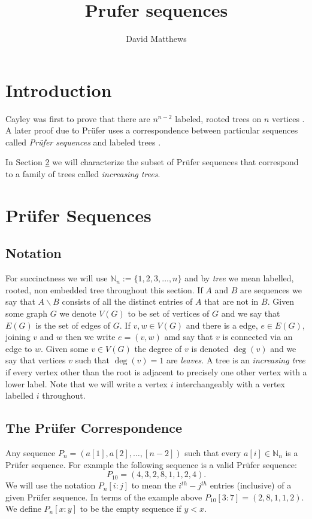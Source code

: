 \documentclass[10pt]{article} %
\title{Prufer sequences}
\author{David Matthews}
\theoremstyle{definition}
\begin{document}
\section{Introduction}
Cayley was first to prove that there are $n^{n-2}$ labeled, rooted trees on $n$ vertices \cite{Cayley}. A later proof due to Pr\"{u}fer uses a correspondence between particular sequences called \emph{Pr\"{u}fer sequences} and labeled trees \cite{Bela}.  

In Section \ref{ps} we will characterize the subset of Pr\"{u}fer sequences that correspond to a family of trees called \emph{increasing trees}.   

\section{Pr\"{u}fer Sequences}\label{ps}

\subsection{Notation}
For succinctness we will use $\mathbb{N}_{n}:= \{1,2,3,\dots,n\}$ and by \emph{tree} we mean labelled, rooted, non embedded tree throughout this section.  If $A$ and $B$ are sequences we say that $A \backslash B$ consists of all the distinct entries of $A$ that are not in $B$.  Given some graph $G$ we denote $V(G)$ to be set of vertices of $G$ and we say that $E(G)$ is the set of edges of $G$.  If $v,w \in V(G)$ and there is a edge, $e \in E(G)$, joining $v$ and $w$ then we write $e = (v,w)$ amd say that $v$ is connected via an edge to $w$.  Given some $v \in V(G)$ the degree of $v$ is denoted $\deg(v)$ and we say that vertices $v$ such that $\deg(v) = 1$ are \emph{leaves}.   A tree is an \emph{increasing tree} if every vertex other than the root is adjacent to precisely one other vertex with a lower label.  Note that we will write a vertex $i$ interchangeably with a vertex labelled $i$ throughout.

\subsection{The Pr\"{u}fer Correspondence}

Any sequence $P_{n} = (a[1],a[2],\dots,[n-2])$ such that every $a[i] \in \mathbb{N}_{n}$ is a Pr\"{u}fer sequence.  For example the following sequence is a valid Pr\"{u}fer sequence:
\[P_{10} = (4,3,2,8,1,1,2,4).\]
We will use the notation $P_{n}[i:j]$ to mean the $i^{th} - j^{th}$ entries (inclusive) of a given Pr\"{u}fer sequence. In terms of the example above $P_{10}[3 : 7] = (2,8,1,1,2)$. We define $P_{n}[x:y]$ to be the empty sequence if $y < x $.  
\end{document}

